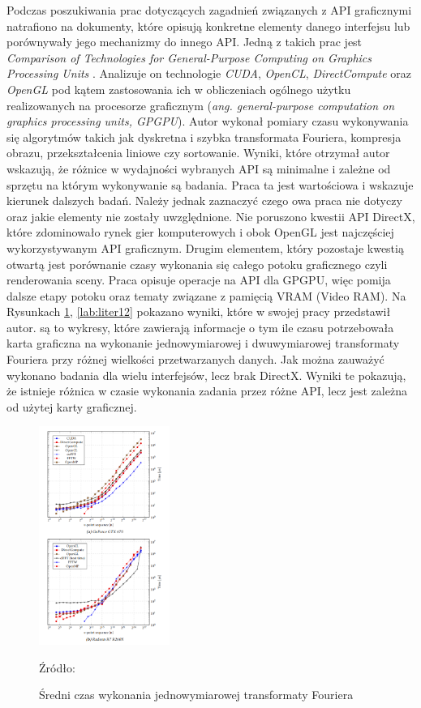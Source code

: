 \documentclass[archive]{mgr}
\begin{document}
Podczas poszukiwania prac dotyczących zagadnień związanych z API graficznymi natrafiono na dokumenty, które opisują konkretne elementy danego interfejsu lub porównywały jego mechanizmy do innego API. Jedną z takich prac jest \emph{Comparison of Technologies for General-Purpose Computing on Graphics Processing Units} \cite{lit1}. Analizuje on technologie \emph{CUDA}, \emph{OpenCL}, \emph{DirectCompute} oraz \emph{OpenGL} pod kątem zastosowania ich w obliczeniach ogólnego użytku realizowanych na procesorze graficznym (\emph{ang. general-purpose computation on graphics processing units, GPGPU}). Autor wykonał pomiary czasu wykonywania się algorytmów takich jak dyskretna i szybka transformata Fouriera, kompresja obrazu, przekształcenia liniowe czy sortowanie.  Wyniki, które otrzymał autor wskazują, że różnice w wydajności wybranych API są minimalne i zależne od sprzętu na którym wykonywanie są badania. Praca ta jest wartościowa i wskazuje kierunek dalszych badań. Należy jednak zaznaczyć czego owa praca nie dotyczy oraz jakie elementy nie zostały uwzględnione. Nie poruszono kwestii API DirectX, które zdominowało rynek gier komputerowych i obok OpenGL jest najczęściej wykorzystywanym API graficznym. Drugim elementem, który pozostaje kwestią otwartą jest porównanie czasy wykonania się całego potoku graficznego czyli renderowania sceny. Praca opisuje operacje na API dla GPGPU, więc pomija dalsze etapy potoku oraz tematy związane z pamięcią VRAM (Video RAM). Na Rysunkach \ref{lab:liter11}, \ref{lab:liter12} pokazano wyniki, które w swojej pracy przedstawił autor. są to wykresy, które zawierają informacje o tym ile czasu potrzebowała karta graficzna na wykonanie jednowymiarowej i  dwuwymiarowej transformaty Fouriera przy różnej wielkości przetwarzanych danych. Jak można zauważyć wykonano badania dla wielu interfejsów, lecz brak DirectX. Wyniki te pokazują, że istnieje różnica w czasie wykonania zadania przez różne API, lecz jest zależna od użytej karty graficznej.\\
\newpage
\begin{figure}[h!]
  \centering
    \includegraphics[width=0.38\textwidth]{images/lit/1.png}
   \caption{Średni czas wykonania jednowymiarowej transformaty Fouriera}
   Źródło: \cite{lit1}
   \label{lab:liter11}
\end{figure}
\end{document}
